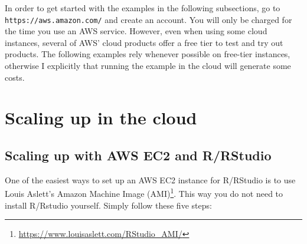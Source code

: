 \documentclass[
  12pt,
]{style/krantz}
\renewcommand{\href}[2]{#2\footnote{\url{#1}}}
\begin{document}
In order to get started with the examples in the following subsections, go to \texttt{https://aws.amazon.com/} and create an account. You will only be charged for the time you use an AWS service. However, even when using some cloud instances, several of AWS' cloud products offer a free tier to test and try out products. The following examples rely whenever possible on free-tier instances, otherwise I explicitly that running the example in the cloud will generate some costs.

\hypertarget{scaling-up-in-the-cloud}{%
\section{Scaling up in the cloud}\label{scaling-up-in-the-cloud}}

\hypertarget{scaling-up-with-aws-ec2-and-rrstudio}{%
\subsection{Scaling up with AWS EC2 and R/RStudio}\label{scaling-up-with-aws-ec2-and-rrstudio}}

One of the easiest ways to set up an AWS EC2 instance for R/RStudio is to use \href{https://www.louisaslett.com/RStudio_AMI/}{Louis Aslett's Amazon Machine Image (AMI)}. This way you do not need to install R/Rstudio yourself. Simply follow these five steps:
\end{document}
